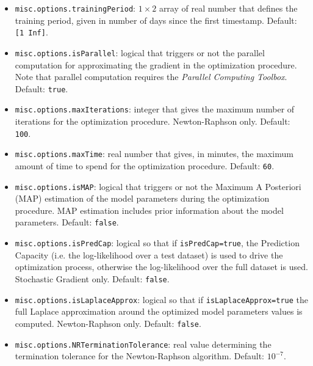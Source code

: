 \begin{itemize}
\begin{itemize}
\item \lstinline[basicstyle = \mlttfamily \small ]!misc.options.trainingPeriod!:  $1\times2$ array of real number that defines the training period, given in number of days since the first timestamp. Default: \lstinline[basicstyle = \mlttfamily \small ]![1 Inf]!. 
\item \lstinline[basicstyle = \mlttfamily \small ]!misc.options.isParallel!: logical that triggers or not the parallel computation for approximating the gradient in the optimization procedure. Note that parallel computation requires the \MATLAB{} \emph{Parallel Computing Toolbox}. Default: \lstinline[basicstyle = \mlttfamily \small ]!true!.
\item \lstinline[basicstyle = \mlttfamily \small ]!misc.options.maxIterations!: integer that gives the maximum number of iterations for the optimization procedure. Newton-Raphson only. Default: \lstinline[basicstyle = \mlttfamily \small ]!100!.
\item \lstinline[basicstyle = \mlttfamily \small ]!misc.options.maxTime!: real number that gives, in minutes, the maximum amount of  time to spend for the optimization procedure. Default: \lstinline[basicstyle = \mlttfamily \small ]!60!.
\item \lstinline[basicstyle = \mlttfamily \small ]!misc.options.isMAP!: logical that triggers or not the Maximum A Posteriori (MAP) estimation of the model parameters during the optimization procedure. MAP estimation includes prior information about the model parameters. Default: \lstinline[basicstyle = \mlttfamily \small ]!false!.
\item \lstinline[basicstyle = \mlttfamily \small ]!misc.options.isPredCap!: logical so that if \lstinline[basicstyle = \mlttfamily \small ]!isPredCap=true!, the Prediction Capacity (i.e. the log-likelihood over a test dataset) is used to drive the optimization process, otherwise the log-likelihood over the full dataset is used. Stochastic Gradient only. Default: \lstinline[basicstyle = \mlttfamily \small ]!false!.
\item \lstinline[basicstyle = \mlttfamily \small ]!misc.options.isLaplaceApprox!: logical so that if \lstinline[basicstyle = \mlttfamily \small ]!isLaplaceApprox=true! the full Laplace approximation around the optimized model parameters values is computed. Newton-Raphson only. Default: \lstinline[basicstyle = \mlttfamily \small ]!false!.
\item \lstinline[basicstyle = \mlttfamily \small ]!misc.options.NRTerminationTolerance!: real value determining the termination tolerance for the Newton-Raphson algorithm. Default: $10^{-7}$.

\end{itemize}
\end{itemize}
